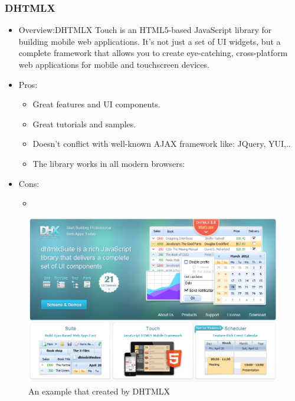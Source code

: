 \documentclass[14pt,a4paper]{extreport}
\begin{document}
			\subsubsection{DHTMLX}
			\begin{itemize}
				\item Overview:DHTMLX Touch is an HTML5-based JavaScript library for building mobile web applications. It’s not just a set of UI widgets, but a complete framework that allows you to create eye-catching, cross-platform web applications for mobile and touchscreen devices.
				\item Pros: 
					\begin{itemize}
						\item Great features and UI components.
						\item Great tutorials and samples.
						\item Doesn't conflict with well-known AJAX framework like: JQuery, YUI,..
						\item The library works in all modern browsers: 
						
					\end{itemize}
				\item Cons:
					\begin{itemize}
						\item
					
					\end{itemize}
			\end{itemize}
			\begin{figure}
				\begin{center}
				\includegraphics[scale=0.7]{dhtmlx.png}
				\caption{An example that created by DHTMLX}
				\end{center}			
			\end{figure}
\end{document}
